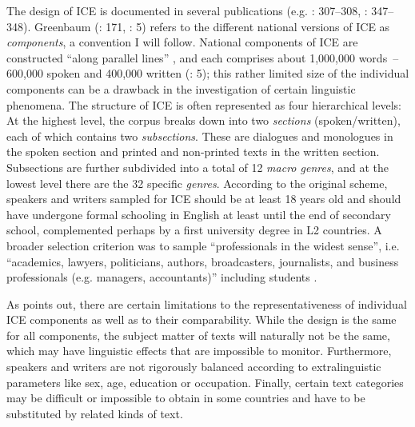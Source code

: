 The design of ICE is documented in several publications (e.g. \citealt{NelsonWallisAarts2002}: 307–308, \citealt{Aarts2011}: 347–348). Greenbaum (\citeyear{Greenbaum1992}: 171, \citeyear{Greenbaum1996}: 5) refers to the different national versions of ICE as \textit{components}, a convention I will follow. National compo\-nents of ICE are constructed “along parallel lines” \citep[171]{Greenbaum1992}, and each comprises about 1,000,000 words~– 600,000 spoken and 400,000 written (\citealt{NelsonWallisAarts2002}: 5); this rather limited size of the individual components can be a drawback in the investigation of certain linguistic phenomena. The structure of ICE is often repre\-sented as four hierarchical levels: At the highest level, the corpus breaks down into two \textit{sections} (spoken/written), each of which contains two \textit{subsections}. These are dialogues and monologues in the spoken section and printed and non-printed texts in the written section. Subsections are further subdivided into a total of 12 \textit{macro genres}, and at the lowest level there are the 32 specific \textit{genres}. According to the original scheme, speakers and writers sampled for ICE should be at least 18 years old and should have undergone formal schooling in English at least until the end of secondary school, complemented perhaps by a first university degree in L2 countries. A broader selection criterion was to sample “professionals in the widest sense”, i.e. “academics, lawyers, politicians, authors, broadcasters, journalists, and business professionals (e.g. managers, accountants)” including students \citep[177]{Greenbaum1992}.

As \citet[5]{Greenbaum1996} points out, there are certain limitations to the representativeness of individual ICE components as well as to their comparability. While the design is the same for all components, the subject matter of texts will naturally not be the same, which may have linguistic effects that are impossible to monitor. Furthermore, speakers and writers are not rigorously balanced according to extralinguistic parameters like sex, age, education or occupation. Finally, certain text categories may be difficult or impossible to obtain in some countries and have to be substituted by related kinds of text.

